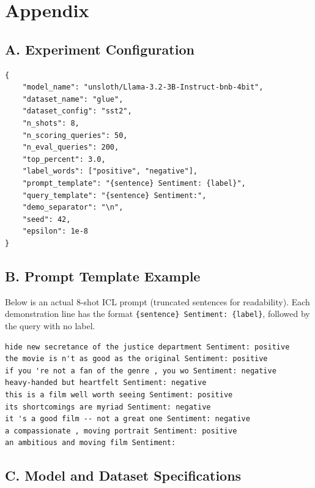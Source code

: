 \documentclass[twoside,english]{article}
\begin{document}
\appendix
\section*{Appendix}

\subsection*{A. Experiment Configuration}

\begin{lstlisting}[language={},caption={Default experiment configuration (JSON).}]
{
    "model_name": "unsloth/Llama-3.2-3B-Instruct-bnb-4bit",
    "dataset_name": "glue",
    "dataset_config": "sst2",
    "n_shots": 8,
    "n_scoring_queries": 50,
    "n_eval_queries": 200,
    "top_percent": 3.0,
    "label_words": ["positive", "negative"],
    "prompt_template": "{sentence} Sentiment: {label}",
    "query_template": "{sentence} Sentiment:",
    "demo_separator": "\n",
    "seed": 42,
    "epsilon": 1e-8
}
\end{lstlisting}

\subsection*{B. Prompt Template Example}

Below is an actual 8-shot ICL prompt (truncated sentences for readability). Each demonstration line has the format \texttt{\{sentence\} Sentiment: \{label\}}, followed by the query with no label.

\begin{lstlisting}[language={},caption={Example 8-shot prompt fed to the model.}]
hide new secretance of the justice department Sentiment: positive
the movie is n't as good as the original Sentiment: positive
if you 're not a fan of the genre , you wo Sentiment: negative
heavy-handed but heartfelt Sentiment: negative
this is a film well worth seeing Sentiment: positive
its shortcomings are myriad Sentiment: negative
it 's a good film -- not a great one Sentiment: negative
a compassionate , moving portrait Sentiment: positive
an ambitious and moving film Sentiment:
\end{lstlisting}

\subsection*{C. Model and Dataset Specifications}
\end{document}

